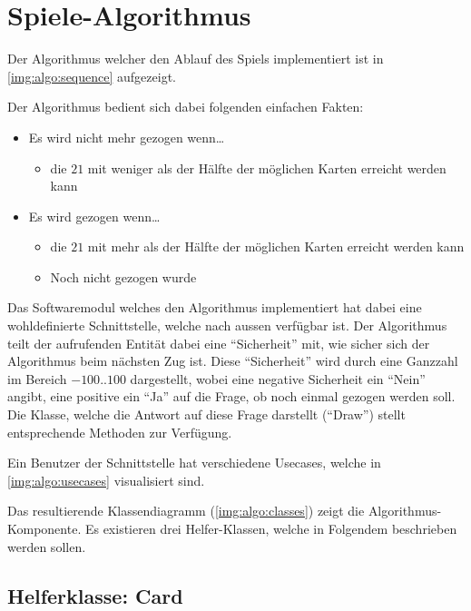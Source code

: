 \chapter{Spiele-Algorithmus}

    Der Algorithmus welcher den Ablauf des Spiels implementiert ist in
    \autoref{img:algo:sequence} aufgezeigt.

    Der Algorithmus bedient sich dabei folgenden einfachen Fakten:

    \begin{itemize}
        \item Es wird nicht mehr gezogen wenn\dots
            \begin{itemize}
                \item die $21$ mit weniger als der Hälfte der möglichen Karten
                    erreicht werden kann
            \end{itemize}
        \item Es wird gezogen wenn\dots
            \begin{itemize}
                \item die $21$ mit mehr als der Hälfte der möglichen Karten
                    erreicht werden kann
                \item Noch nicht gezogen wurde
            \end{itemize}
    \end{itemize}

    Das Softwaremodul welches den Algorithmus implementiert hat dabei eine
    wohldefinierte Schnittstelle, welche nach aussen verfügbar ist.
    Der Algorithmus teilt der aufrufenden Entität dabei eine ``Sicherheit'' mit,
    wie sicher sich der Algorithmus beim nächsten Zug ist.
    Diese ``Sicherheit'' wird durch eine Ganzzahl im Bereich $-100..100$
    dargestellt, wobei eine negative Sicherheit ein ``Nein'' angibt, eine
    positive ein ``Ja'' auf die Frage, ob noch einmal gezogen werden soll.
    Die Klasse, welche die Antwort auf diese Frage darstellt (``Draw'') stellt
    entsprechende Methoden zur Verfügung.

    Ein Benutzer der Schnittstelle hat verschiedene Usecases, welche in
    \autoref{img:algo:usecases} visualisiert sind.

    Das resultierende Klassendiagramm (\autoref{img:algo:classes}) zeigt die
    Algorithmus-Komponente.
    Es existieren drei Helfer-Klassen, welche in Folgendem beschrieben werden
    sollen.

    \section{Helferklasse: Card}

